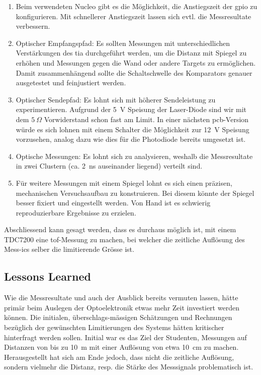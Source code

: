 \begin{enumerate}
    \item Beim verwendeten Nucleo gibt es die Möglichkeit, die Anstiegszeit der \acrshort{gpio} zu konfigurieren. Mit
          schnellerer Anstiegszeit lassen sich evtl. die Messresultate verbessern.
    \item Optischer Empfangspfad: Es sollten Messungen mit unterschiedlichen Verstärkungen des \acrshort{tia}
          durchgeführt werden, um die Distanz mit Spiegel zu erhöhen und Messungen gegen die Wand oder andere Targets zu
          ermöglichen. Damit zusammenhängend sollte die Schaltschwelle des Komparators genauer ausgetestet und
          feinjustiert werden.
    \item Optischer Sendepfad: Es lohnt sich mit höherer Sendeleistung zu experimentieren. Aufgrund der 5~V Speisung
          der Laser-Diode sind wir mit dem $5~\Omega$ Vorwiderstand schon fast am Limit. In einer nächsten
          \acrshort{pcb}-Version würde es sich lohnen mit einem Schalter die Möglichkeit zur 12~V Speisung vorzusehen,
          analog dazu wie dies für die Photodiode bereits umgesetzt ist.
    \item Optische Messungen: Es lohnt sich zu analysieren, weshalb die Messresultate in zwei Clustern (ca. 2~ns
          auseinander liegend) verteilt sind.
    \item Für weitere Messungen mit einem Spiegel lohnt es sich einen präzisen, mechanischen Versuchsaufbau zu
          konstruieren. Bei diesem könnte der Spiegel besser fixiert und eingestellt werden. Von Hand ist es schwierig
          reproduzierbare Ergebnisse zu erzielen.
\end{enumerate}

Abschliessend kann gesagt werden, dass es durchaus möglich ist, mit einem TDC7200 eine \acrshort{tof}-Messung zu machen,
bei welcher die zeitliche Auflösung des Mess-\acrshort{ic}s selber die limitierende Grösse ist.

\subsection{Lessons Learned}

Wie die Messresultate und auch der Ausblick bereits vermuten lassen, hätte primär beim Auslegen der Optoelektronik etwas
mehr Zeit investiert werden können. Die initialen, überschlags-mässigen Schätzungen und Rechnungen bezüglich der gewünschten
Limitierungen des Systems hätten kritischer hinterfragt werden sollen. Initial war es das Ziel der Studenten, Messungen
auf Distanzen von bis zu 10~m mit einer Auflösung von etwa 10~cm zu machen. Herausgestellt hat sich am Ende jedoch, dass
nicht die zeitliche Auflösung, sondern vielmehr die Distanz, resp. die Stärke des Messsignals problematisch ist.

